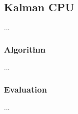 \subsection{Kalman CPU}
\label{sec:link2d:kalman-cpu}

...

\subsubsection{Algorithm}

...

\subsubsection{Evaluation}

...

